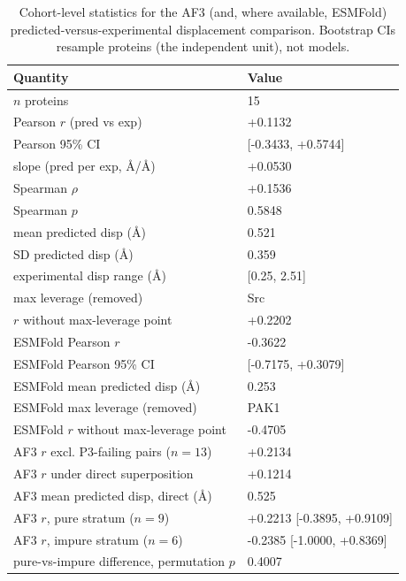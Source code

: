\begin{table}[htbp]
\centering
\begin{tabular}{ll}
\toprule
Quantity & Value \\
\midrule
$n$ proteins & 15 \\
Pearson $r$ (pred vs exp) & +0.1132 \\
Pearson 95\% CI & [-0.3433, +0.5744] \\
slope (pred per exp, \AA/\AA) & +0.0530 \\
Spearman $\rho$ & +0.1536 \\
Spearman $p$ & 0.5848 \\
mean predicted disp (\AA) & 0.521 \\
SD predicted disp (\AA) & 0.359 \\
experimental disp range (\AA) & [0.25, 2.51] \\
max leverage (removed) & Src \\
$r$ without max-leverage point & +0.2202 \\
ESMFold Pearson $r$ & -0.3622 \\
ESMFold Pearson 95\% CI & [-0.7175, +0.3079] \\
ESMFold mean predicted disp (\AA) & 0.253 \\
ESMFold max leverage (removed) & PAK1 \\
ESMFold $r$ without max-leverage point & -0.4705 \\
AF3 $r$ excl. P3-failing pairs ($n=13$) & +0.2134 \\
AF3 $r$ under direct superposition & +0.1214 \\
AF3 mean predicted disp, direct (\AA) & 0.525 \\
AF3 $r$, pure stratum ($n=9$) & +0.2213 [-0.3895, +0.9109] \\
AF3 $r$, impure stratum ($n=6$) & -0.2385 [-1.0000, +0.8369] \\
pure-vs-impure difference, permutation $p$ & 0.4007 \\
\bottomrule
\end{tabular}
\caption{Cohort-level statistics for the AF3 (and, where available, ESMFold) predicted-versus-experimental displacement comparison. Bootstrap CIs resample proteins (the independent unit), not models.}
\label{tab:stats}
\end{table}
